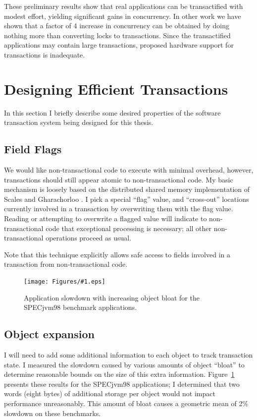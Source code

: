 \documentclass[12pt,twoside]{article}
\newcommand{\note}[1]{}%
\newcommand{\punt}[1]{}%
\newcommand{\sis}{\linespread{1.0}\setlength{\baselineskip}{0.8\baselineskip}}
\newcommand{\epsfigput}[2]{%
\begin{figure}[t]\sis%
\begin{center}%
\texttt{[image: Figures/\#1.eps]}%
\end{center}%
\caption{#2}%
\label{fig:#1}%
\end{figure}%
}
\newcommand{\secput}[2]{\section{#2}\label{sec:#1}}
\newcommand{\figref}[1]         {Figure~\ref{fig:#1}}
\begin{document}
\vspace*{5mm}

These preliminary results show that real applications can be
transactified with modest effort, yielding significant gains in
concurrency.  In other work \cite{AnanianAsKuLeLi04} we have shown
that a factor of 4 increase in concurrency can be obtained
by doing nothing more than converting locks to transactions.  Since
the transactified applications may contain large transactions,
proposed hardware support for transactions is inadequate.

\secput{efficient}{Designing Efficient Transactions}
In this section I briefly describe some desired properties of the
software transaction system being designed for this thesis.

\subsection{Field Flags}\label{sec:flagfield}
\note{Missing: performance numbers for adding check.  Use ``no trans''
version of transaction app and add check into the access functions.}
We would like non-transactional code to execute with minimal overhead,
however, transactions should still appear atomic to non-transactional
code.  My basic mechanism is loosely based on the
distributed shared memory implementation of Scales and Gharachorloo
\cite{ScalesGh97}.  I pick a special ``flag'' value, and
``cross-out'' locations currently involved in a transaction by
overwriting them with the flag value.  Reading or attempting to
overwrite a flagged value will indicate to non-transactional code
that exceptional processing is necessary; all other non-transactional
operations proceed as usual.

Note that this technique explicitly allows safe access to fields
involved in a transaction from non-transactional code.
\punt{
Ensuring that transactional updates remain atomic to non-transactional
code eases ``transactification'' and 
Key idea is to allow safe access by non-transactional code, so as to
allow transactification.
}

\epsfigput{bloat}{Application slowdown with increasing object bloat
for the SPECjvm98 benchmark applications.}
\subsection{Object expansion}
I will need to add some additional information to each object to
track transaction state.  I measured the slowdown caused by various
amounts of object ``bloat'' to determine reasonable bounds on the
size of this extra information.  \figref{bloat} presents these
results for the SPECjvm98 applications; I determined that two words
(eight bytes) of additional storage per object would not impact
performance unreasonably.  This amount of bloat causes a geometric
mean of 2\% slowdown on these benchmarks.
\end{document}
